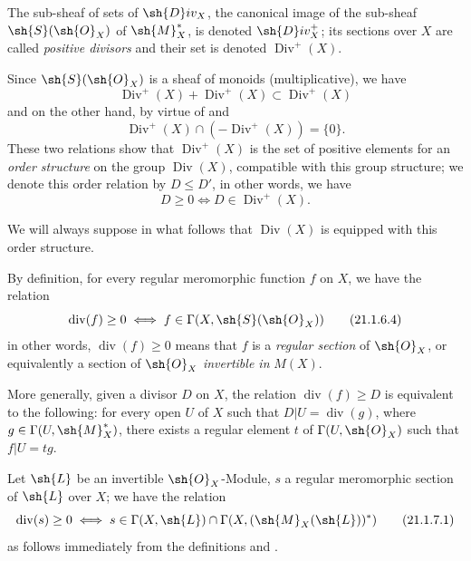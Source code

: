 \begin{definition}[21.1.6]
\label{IV.21.1.6}
The sub-sheaf of sets of $\sh{D}iv_X$, the canonical image of the sub-sheaf $\sh{S}(\sh{O}_X)$ of $\sh{M}_X^*$, is denoted $\sh{D}iv_X^+$;
its sections over $X$ are called \emph{positive divisors} and their set is denoted $\operatorname{Div}^+(X)$.
\end{definition}

Since $\sh{S}(\sh{O}_X)$ is a sheaf of monoids (multiplicative), we have
\[
\label{IV.21.1.6.1}
  \operatorname{Div}^+(X)+\operatorname{Div}^+(X)\subset\operatorname{Div}^+(X)
  \tag{21.1.6.1}
\]
and on the other hand, by virtue of  and 
\[
\label{IV.21.1.6.2}
  \operatorname{Div}^+(X)\cap(-\operatorname{Div}^+(X))=\{0\}.
  \tag{21.1.6.2}
\]
These two relations show that $\operatorname{Div}^+(X)$ is the set of positive elements for an \emph{order structure} on the group $\operatorname{Div}(X)$, compatible with this group structure;
we denote this order relation by $D\leq D'$, in other words, we have
\[
\label{IV.21.1.6.3}
  D\geq 0 \iff D\in\operatorname{Div}^+(X).
  \tag{21.1.6.3}
\]

We will always suppose in what follows that $\operatorname{Div}(X)$ is equipped with this order structure.

By definition, for every regular meromorphic function $f$ on $X$, we have the relation
\[
\label{IV.21.1.6.4}
  \operatorname{div}(f)\geq 0 \iff f\in\Gamma(X,\sh{S}(\sh{O}_X))
  \tag{21.1.6.4}
\]
in other words, $\operatorname{div}(f)\geq 0$ means that $f$ is a \emph{regular section} of $\sh{O}_X$, or equivalently a section of $\sh{O}_X$ \emph{invertible in} $M(X)$.

More generally, given a divisor $D$ on $X$, the relation $\operatorname{div}(f)\geq D$ is equivalent to the following: for every open $U$ of $X$ such that $D|U=\operatorname{div}(g)$, where $g\in\Gamma(U,\sh{M}_X^*)$, there exists a regular element $t$ of $\Gamma(U,\sh{O}_X)$ such that $f|U=tg$.

\begin{env}[21.1.7]
\label{IV.21.1.7}
Let $\sh{L}$ be an invertible $\sh{O}_X$-Module, $s$ a regular meromorphic section of $\sh{L}$ over $X$;
we have the relation
\[
\label{IV.21.1.7.1}
  \operatorname{div}(s)\geq 0 \iff s\in\Gamma(X,\sh{L})\cap\Gamma(X,(\sh{M}_X(\sh{L}))^*)
  \tag{21.1.7.1}
\]
as follows immediately from the definitions  and .
\end{env}

